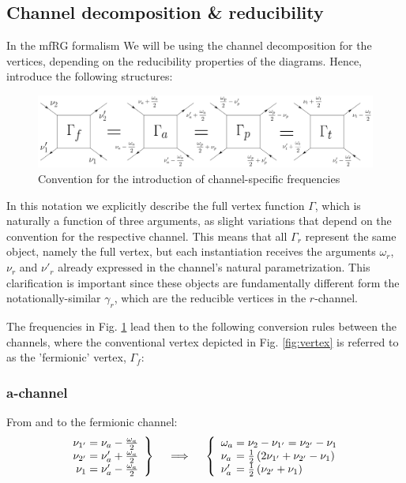 \documentclass[12pt,a4paper,roman]{article}
\begin{document}
\subsection*{Channel decomposition \& reducibility}
In the mfRG formalism
We will be using the channel decomposition for the vertices, depending on the reducibility properties of the diagrams. Hence, introduce the following structures:

\begin{figure}[ht]
    \centering
    \includegraphics[width=\linewidth]{figures/channels_with_labels.png}
    \caption{Convention for the introduction of channel-specific frequencies}
    \label{fig:channels}
\end{figure}
In this notation we explicitly describe the full vertex function $\Gamma$, which is naturally a function of three arguments, as slight variations that depend on the convention for the respective channel. This means that all $\Gamma_r$ represent the same object, namely the full vertex, but each instantiation receives the arguments $\omega_r$, $\nu_r$ and $\nu'_r$ already expressed in the channel's natural parametrization. This clarification is important since these objects are fundamentally different form the notationally-similar $\gamma_r$, which are the reducible vertices in the $r$-channel.

The frequencies in Fig. \ref{fig:channels} lead then to the following conversion rules between the channels, where the conventional vertex depicted in Fig. \ref{fig:vertex} is referred to as the 'fermionic' vertex, $\Gamma_f$:

\subsubsection*{a-channel}
From and to the fermionic channel:
\begin{align}
    \left.\begin{array}{r@{\mskip\thickmuskip}l}
    \nu_{1'} &= \nu_a - \frac{\omega_a}{2} \\
    \nu_{2'} &= \nu'_a + \frac{\omega_a}{2} \\
    \nu_{1 } &= \nu'_a - \frac{\omega_a}{2} \\
  \end{array} \right\}
  \quad \implies \quad
  \left\{\begin{array}{l@{\mskip\thickmuskip}l}
    \omega_a &= \nu_{2} - \nu_{1'} = \nu_{2'} - \nu_{1}\\
    \nu_a    &= \frac{1}{2}\left(2\nu_{1'}+\nu_{2'}-\nu_{1}\right) \\
    \nu'_a   &= \frac{1}{2}\left(\nu_{2'} + \nu_{1}\right)\\
  \end{array}\right.
\end{align}
\end{document}
